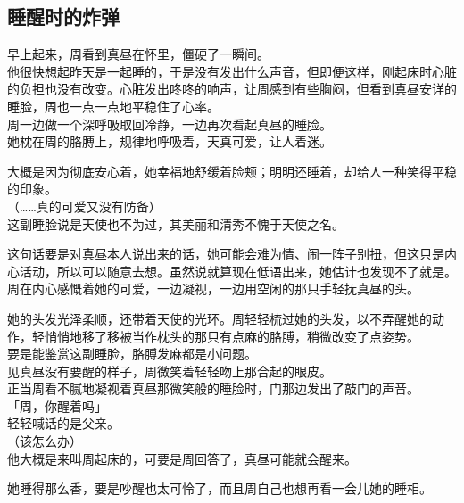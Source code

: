 \subsection{睡醒时的炸弹}

早上起来，周看到真昼在怀里，僵硬了一瞬间。\\

他很快想起昨天是一起睡的，于是没有发出什么声音，但即便这样，刚起床时心脏的负担也没有改变。心脏发出咚咚的响声，让周感到有些胸闷，但看到真昼安详的睡脸，周也一点一点地平稳住了心率。\\

周一边做一个深呼吸取回冷静，一边再次看起真昼的睡脸。\\

她枕在周的胳膊上，规律地呼吸着，天真可爱，让人着迷。

大概是因为彻底安心着，她幸福地舒缓着脸颊；明明还睡着，却给人一种笑得平稳的印象。\\

（……真的可爱又没有防备）\\

这副睡脸说是天使也不为过，其美丽和清秀不愧于天使之名。

这句话要是对真昼本人说出来的话，她可能会难为情、闹一阵子别扭，但这只是内心活动，所以可以随意去想。虽然说就算现在低语出来，她估计也发现不了就是。\\

周在内心感慨着她的可爱，一边凝视，一边用空闲的那只手轻抚真昼的头。

她的头发光泽柔顺，还带着天使的光环。周轻轻梳过她的头发，以不弄醒她的动作，轻悄悄地移了移被当作枕头的那只有点麻的胳膊，稍微改变了点姿势。\\

要是能鉴赏这副睡脸，胳膊发麻都是小问题。\\

见真昼没有要醒的样子，周微笑着轻轻吻上那合起的眼皮。\\

正当周看不腻地凝视着真昼那微笑般的睡脸时，门那边发出了敲门的声音。\\

「周，你醒着吗」\\

轻轻喊话的是父亲。\\

（该怎么办）\\

他大概是来叫周起床的，可要是周回答了，真昼可能就会醒来。

她睡得那么香，要是吵醒也太可怜了，而且周自己也想再看一会儿她的睡相。\\

